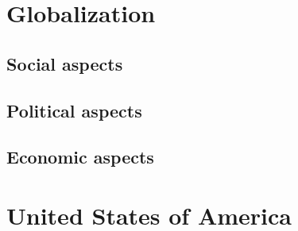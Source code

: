 \documentclass[10pt]{article}
\begin{document}
\section{Globalization}
	\label{sec:global}
\subsection{Social aspects}
	\label{ssec:global@social}
\subsection{Political aspects}
	\label{ssec:global@political}
\subsection{Economic aspects}
	\label{ssec:global@economic}

\section{United States of America}
	\label{sec:usa}
\end{document}

